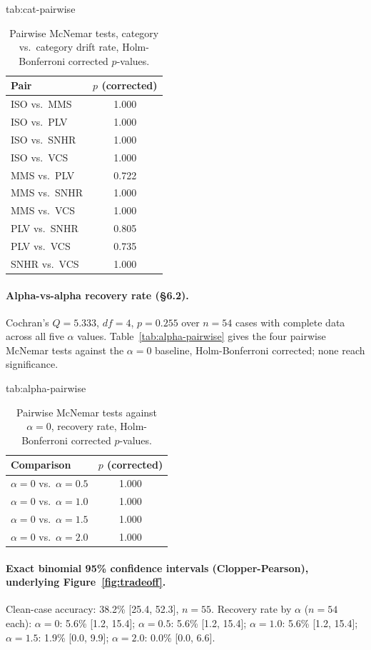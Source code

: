 \documentclass[pmlr,twocolumn,10pt]{jmlr} %
\begin{document}
\begin{table}[htbp]
\floatconts
  {tab:cat-pairwise}
  {\caption{Pairwise McNemar tests, category vs.\ category drift rate,
  Holm-Bonferroni corrected $p$-values.}}
  {\small
  \begin{tabular}{@{}lc@{}}
  \toprule
  \bfseries Pair & \bfseries $p$ (corrected) \\
  \midrule
  ISO vs.\ MMS & 1.000 \\
  ISO vs.\ PLV & 1.000 \\
  ISO vs.\ SNHR & 1.000 \\
  ISO vs.\ VCS & 1.000 \\
  MMS vs.\ PLV & 0.722 \\
  MMS vs.\ SNHR & 1.000 \\
  MMS vs.\ VCS & 1.000 \\
  PLV vs.\ SNHR & 0.805 \\
  PLV vs.\ VCS & 0.735 \\
  SNHR vs.\ VCS & 1.000 \\
  \bottomrule
  \end{tabular}}
\end{table}

\paragraph{Alpha-vs-alpha recovery rate (\S6.2).} Cochran's $Q=5.333$,
$df=4$, $p=0.255$ over $n=54$ cases with complete data across all five
$\alpha$ values. Table~\ref{tab:alpha-pairwise} gives the four pairwise
McNemar tests against the $\alpha=0$ baseline, Holm-Bonferroni corrected;
none reach significance.

\begin{table}[htbp]
\floatconts
  {tab:alpha-pairwise}
  {\caption{Pairwise McNemar tests against $\alpha=0$, recovery rate,
  Holm-Bonferroni corrected $p$-values.}}
  {\small
  \begin{tabular}{@{}lc@{}}
  \toprule
  \bfseries Comparison & \bfseries $p$ (corrected) \\
  \midrule
  $\alpha=0$ vs.\ $\alpha=0.5$ & 1.000 \\
  $\alpha=0$ vs.\ $\alpha=1.0$ & 1.000 \\
  $\alpha=0$ vs.\ $\alpha=1.5$ & 1.000 \\
  $\alpha=0$ vs.\ $\alpha=2.0$ & 1.000 \\
  \bottomrule
  \end{tabular}}
\end{table}

\paragraph{Exact binomial 95\% confidence intervals (Clopper-Pearson),
underlying Figure~\ref{fig:tradeoff}.} Clean-case accuracy: 38.2\%
[25.4, 52.3], $n=55$. Recovery rate by $\alpha$ ($n=54$ each):
$\alpha=0$: 5.6\% [1.2, 15.4]; $\alpha=0.5$: 5.6\% [1.2, 15.4];
$\alpha=1.0$: 5.6\% [1.2, 15.4]; $\alpha=1.5$: 1.9\% [0.0, 9.9];
$\alpha=2.0$: 0.0\% [0.0, 6.6].
\end{document}
